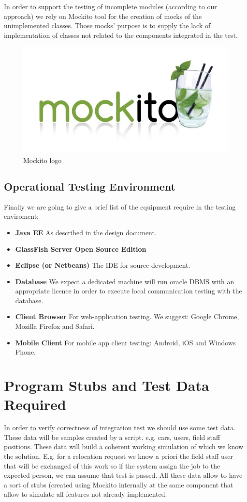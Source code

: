 \documentclass[english]{article}
\begin{document}
			In order to support the testing of incomplete modules (according to our approach) we rely on Mockito tool for the creation of mocks of the unimplemented classes. Those mocks' purpose is to supply the lack of implementation of classes not related to the components integrated in the test.
			\begin{figure}[H]
				\centering
				\includegraphics[scale=0.4]{./Images/mockito.jpg}%
				\caption{Mockito logo}
			\end{figure}
	\subsection{Operational Testing Environment}
		Finally we are going to give a brief list of the equipment require in the testing enviroment:
		\begin{itemize}
			\item \textbf{Java EE} As described in the design document.
			\item \textbf{GlassFish Server Open Source Edition}
			\item \textbf{Eclipse (or Netbeans)} The IDE for source development.
			\item \textbf{Database} We expect a dedicated machine will run oracle DBMS with an appropriate licence in order to execute local communication testing with the database. 
			\item \textbf{Client Browser} For web-application testing. We suggest: Google Chrome, Mozilla Firefox and Safari. 
			\item \textbf{Mobile Client} For mobile app client testing: Android, iOS and Windows Phone.
		\end{itemize}
\section{Program Stubs and Test Data Required}
		In order to verify correctness of integration test we should use some test data. These data will be samples created by a script. e.g. cars, users, field staff positions.
These data will build a coherent working simulation of which we know the solution. E.g. for a relocation request we know a priori the field staff user that will be exchanged of this work so if the system assign the job to the expected person, we can assume that test is passed. All these data allow to have a sort of stubs (created using Mockito internally at the same component that allow to simulate all features not already implemented.
\end{document}
